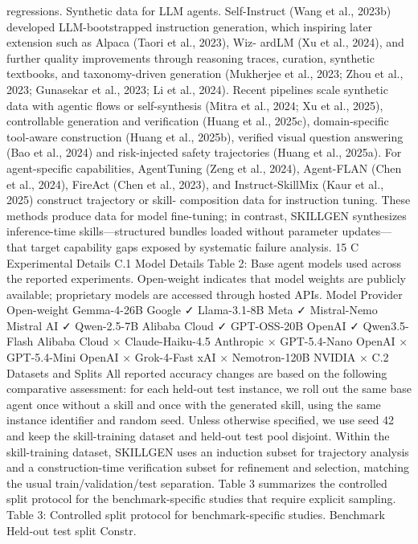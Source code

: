 regressions.
Synthetic data for LLM agents. Self-Instruct (Wang et al., 2023b) developed LLM-bootstrapped
instruction generation, which inspiring later extension such as Alpaca (Taori et al., 2023), Wiz-
ardLM (Xu et al., 2024), and further quality improvements through reasoning traces, curation,
synthetic textbooks, and taxonomy-driven generation (Mukherjee et al., 2023; Zhou et al., 2023;
Gunasekar et al., 2023; Li et al., 2024). Recent pipelines scale synthetic data with agentic flows or
self-synthesis (Mitra et al., 2024; Xu et al., 2025), controllable generation and verification (Huang
et al., 2025c), domain-specific tool-aware construction (Huang et al., 2025b), verified visual question
answering (Bao et al., 2024) and risk-injected safety trajectories (Huang et al., 2025a).
For agent-specific capabilities, AgentTuning (Zeng et al., 2024), Agent-FLAN (Chen et al., 2024),
FireAct (Chen et al., 2023), and Instruct-SkillMix (Kaur et al., 2025) construct trajectory or skill-
composition data for instruction tuning. These methods produce data for model fine-tuning; in
contrast, SKILLGEN synthesizes inference-time skills—structured bundles loaded without parameter
updates—that target capability gaps exposed by systematic failure analysis.
15
C
Experimental Details
C.1
Model Details
Table 2: Base agent models used across the reported experiments. Open-weight indicates that model
weights are publicly available; proprietary models are accessed through hosted APIs.
Model
Provider
Open-weight
Gemma-4-26B
Google
✓
Llama-3.1-8B
Meta
✓
Mistral-Nemo
Mistral AI
✓
Qwen-2.5-7B
Alibaba Cloud
✓
GPT-OSS-20B
OpenAI
✓
Qwen3.5-Flash
Alibaba Cloud
×
Claude-Haiku-4.5
Anthropic
×
GPT-5.4-Nano
OpenAI
×
GPT-5.4-Mini
OpenAI
×
Grok-4-Fast
xAI
×
Nemotron-120B
NVIDIA
×
C.2
Datasets and Splits
All reported accuracy changes are based on the following comparative assessment: for each held-out
test instance, we roll out the same base agent once without a skill and once with the generated skill,
using the same instance identifier and random seed. Unless otherwise specified, we use seed 42
and keep the skill-training dataset and held-out test pool disjoint. Within the skill-training dataset,
SKILLGEN uses an induction subset for trajectory analysis and a construction-time verification subset
for refinement and selection, matching the usual train/validation/test separation. Table 3 summarizes
the controlled split protocol for the benchmark-specific studies that require explicit sampling.
Table 3: Controlled split protocol for benchmark-specific studies.
Benchmark
Held-out test split
Constr.
